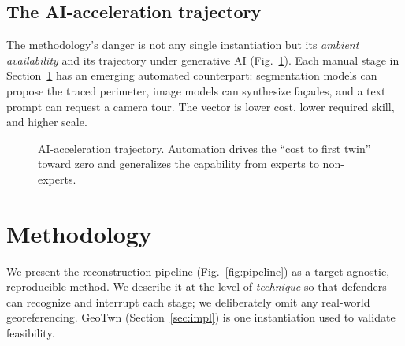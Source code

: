 \documentclass[conference]{IEEEtran}
\begin{document}
\subsection{The AI-acceleration trajectory}
The methodology's danger is not any single instantiation but its \emph{ambient
availability} and its trajectory under generative AI (Fig.~\ref{fig:threat-ai}).
Each manual stage in Section~\ref{sec:method} has an emerging automated
counterpart: segmentation models can propose the traced perimeter, image models
can synthesize façades, and a text prompt can request a camera tour. The vector is
lower cost, lower required skill, and higher scale.

\begin{figure}[t]
\centering
{}
\caption{AI-acceleration trajectory. Automation drives the ``cost to first twin''
toward zero and generalizes the capability from experts to non-experts.}
\label{fig:threat-ai}
\end{figure}

\section{Methodology}
\label{sec:method}
We present the reconstruction pipeline (Fig.~\ref{fig:pipeline}) as a
target-agnostic, reproducible method. We describe it at the level of
\emph{technique} so that defenders can recognize and interrupt each stage; we
deliberately omit any real-world georeferencing. GeoTwn (Section~\ref{sec:impl})
is one instantiation used to validate feasibility.
\end{document}
